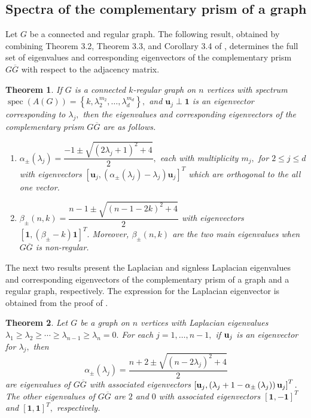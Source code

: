 \documentclass[12pt,a4paper]{article}
\newtheorem{thm}{Theorem}
\def \u {{\bf u}}
\newcommand{\ob}[1]{\left(#1\right)}
\newcommand{\cb}[1]{\left\lbrace #1\right\rbrace}
\newcommand{\tb}[1]{\left[#1\right]}
\begin{document}
\subsection{Spectra of the complementary prism of a graph}
Let $G$ be a connected and regular graph. 
The following result, obtained by combining Theorem 3.2, Theorem 3.3, and Corollary 3.4 of \cite{card1}, determines the full set of eigenvalues and corresponding eigenvectors of the complementary prism $G\overline{G}$ with respect to the adjacency matrix. 
\begin{thm}\cite{card1}\label{5cor1}
    If $G$ is a connected $k$-regular graph on $n$ vertices with spectrum $\operatorname{spec}(A(G))=\cb{k,\lambda_2^{m_2}, \ldots, \lambda_d^{m_d}},$ and $\mathbf{u}_j\perp \mathbf{1}$ is an  eigenvector corresponding to $\lambda_j,$ then the eigenvalues and corresponding eigenvectors of the complementary prism $G\overline{G}$ are as follows. 
    \begin{enumerate}[label=(\roman*)]
        \item $\alpha_{\pm}(\lambda_j)=\dfrac{-1\pm\sqrt{(2\lambda_j+1)^2+4}}{2},$ each with multiplicity $m_j,$ for $2\leq j\leq d$ with eigenvectors $[
            \mathbf{u}_j,
            \ob{\alpha_{\pm}(\lambda_j)-\lambda_j}\mathbf{u}_j]^T$ which are orthogonal to the all one vector.
        
        \item$\beta_{\pm}(n,k)=\dfrac{n-1\pm\sqrt{(n-1-2k)^2+4}}{2}$ with eigenvectors $[
            \mathbf{1},
            \ob{\beta_{\pm}-k}\mathbf{1}]^T.$ Moreover, $\beta_{\pm}(n,k)$ are the two main eigenvalues when $G\overline{G}$ is non-regular.
    \end{enumerate}
\end{thm}
The next two results present the Laplacian and signless Laplacian eigenvalues and corresponding eigenvectors of the complementary prism of a graph and a regular graph, respectively. The expression for the Laplacian eigenvector is obtained from the proof of \cite[Theorem 5.2]{card1}.
\begin{thm}\cite{card1}\label{6th2}
    Let $G$ be a graph on $n$ vertices with Laplacian eigenvalues $\lambda_1\geq \lambda_2\geq\cdots\geq \lambda_{n-1}\geq\lambda_n=0.$ For each $j =1, \ldots, n -1,$ if $\u_j$ is an eigenvector for $\lambda_j,$ then
\[\alpha_{\pm}(\lambda_j) = \dfrac{n + 2 \pm
\sqrt{(n - 2\lambda_j)^2+4}}{2}\]
are eigenvalues of $G\overline{G}$ with associated eigenvectors $\tb{
            \u_j,
            \ob{\lambda_j+1-\alpha_{\pm}\ob{\lambda_j}}\u_j}^T.$ The other eigenvalues of $G\overline{G}$ are $2$ and $0$ with associated eigenvectors  $[
            \mathbf{1},
            -\mathbf{1}]^T$ and $[
            \mathbf{1},
            \mathbf{1}]^T,$ respectively.   
\end{thm}
\end{document}
